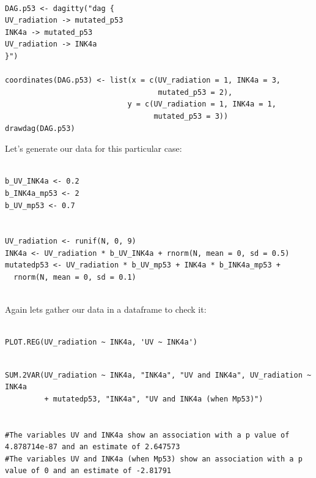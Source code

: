 \documentclass{article}
\begin{document}
\begin{lstlisting}

DAG.p53 <- dagitty("dag {
UV_radiation -> mutated_p53
INK4a -> mutated_p53
UV_radiation -> INK4a
}")

coordinates(DAG.p53) <- list(x = c(UV_radiation = 1, INK4a = 3, 
                                   mutated_p53 = 2),
                            y = c(UV_radiation = 1, INK4a = 1, 
                                  mutated_p53 = 3))
drawdag(DAG.p53)

\end{lstlisting}




Let's generate our data for this particular case:


\begin{lstlisting}

b_UV_INK4a <- 0.2
b_INK4a_mp53 <- 2
b_UV_mp53 <- 0.7


UV_radiation <- runif(N, 0, 9)
INK4a <- UV_radiation * b_UV_INK4a + rnorm(N, mean = 0, sd = 0.5)
mutatedp53 <- UV_radiation * b_UV_mp53 + INK4a * b_INK4a_mp53 + 
  rnorm(N, mean = 0, sd = 0.1)
  
\end{lstlisting}

Again lets gather our data in a dataframe to check it:

\begin{lstlisting}

PLOT.REG(UV_radiation ~ INK4a, 'UV ~ INK4a')

\end{lstlisting}



\begin{lstlisting}

SUM.2VAR(UV_radiation ~ INK4a, "INK4a", "UV and INK4a", UV_radiation ~ INK4a
         + mutatedp53, "INK4a", "UV and INK4a (when Mp53)")


#The variables UV and INK4a show an association with a p value of 4.878714e-87 and an estimate of 2.647573 
#The variables UV and INK4a (when Mp53) show an association with a p value of 0 and an estimate of -2.81791 

\end{lstlisting}
\end{document}
